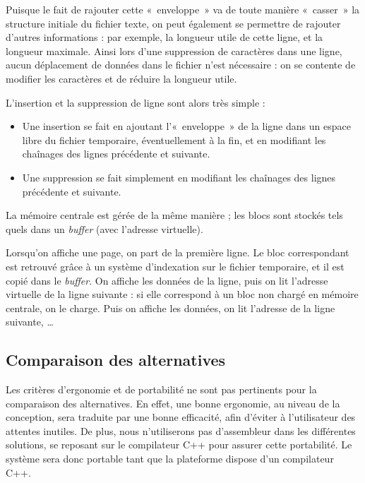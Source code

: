 Puisque le fait de rajouter cette «~enveloppe~» va de toute manière «~casser~» la structure initiale du fichier texte, on peut également se permettre de rajouter d'autres informations : par exemple, la longueur utile de cette ligne, et la longueur maximale. Ainsi lors d'une suppression de caractères dans une ligne, aucun déplacement de données dans le fichier n'est nécessaire : on se contente de modifier les caractères et de réduire la longueur utile.

L'insertion et la suppression de ligne sont alors très simple :
\begin{itemize}
	\item Une insertion se fait en ajoutant l'«~enveloppe~» de la ligne dans un espace libre du fichier temporaire, éventuellement à la fin, et en modifiant les chaînages des lignes précédente et suivante.
	\item Une suppression se fait simplement en modifiant les chaînages des lignes précédente et suivante.
\end{itemize}

La mémoire centrale est gérée de la même manière ; les blocs sont stockés tels
quels dans un \emph{buffer} (avec l'adresse virtuelle).

Lorsqu'on affiche une page, on part de la première ligne. Le bloc correspondant
est retrouvé grâce à un système d'indexation sur le fichier temporaire, et il
est copié dans le \emph{buffer}. On affiche les données de la ligne, puis on lit l'adresse virtuelle de la ligne suivante : si elle correspond à un bloc non chargé en mémoire centrale, on le charge. Puis on affiche les données, on lit l'adresse de la ligne suivante, \ldots


\subsection{Comparaison des alternatives}

Les critères d'ergonomie et de portabilité ne sont pas pertinents pour la
comparaison des alternatives.
En effet, une bonne ergonomie, au niveau de la conception, sera traduite par une
bonne efficacité, afin d'éviter à l'utilisateur des attentes inutiles.
De plus, nous n'utiliserons pas d'assembleur dans les différentes solutions, se
reposant sur le compilateur C++ pour assurer cette portabilité. Le système sera
donc portable tant que la plateforme dispose d'un compilateur C++.

